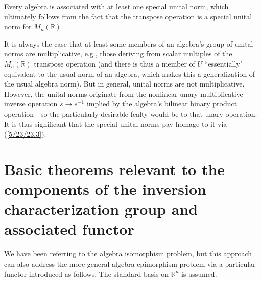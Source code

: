 \documentclass{amsart}
\numberwithin{equation}{section}
\theoremstyle{definition}
\numberwithin{theorem}{section}
\begin{document}
Every algebra is associated with at least one special unital norm, which ultimately follows from the fact that the transpose operation is a special unital norm for $M_n(\mathbb{R})$.

It is always the case that at least some members of an algebra's group of unital norms are multiplicative, e.g., those deriving from scalar multiples of the $M_n(\mathbb{R})$ transpose operation (and there is thus a member of $ U$ ``essentially" equivalent to the usual norm of an algebra, which makes this a generalization of the usual algebra norm).  But in general, unital norms are not multiplicative.  However, the unital norms originate from the nonlinear unary multiplicative inverse operation $s\rightarrow s^{-1}$ implied by the algebra's bilinear binary product operation - so the particularly desirable fealty would be to that unary operation.  It is thus significant that the special unital norms pay homage to it via (\ref{5/23/23.3}). 


\section{Basic theorems relevant to the components of the inversion characterization group and associated functor}

We have been referring to the algebra isomorphism problem, but this approach can also address the more general algebra epimorphism problem via a particular functor introduced as follows.  The standard basis on $\mathbb{R}^n$ is assumed. 
\end{document}
